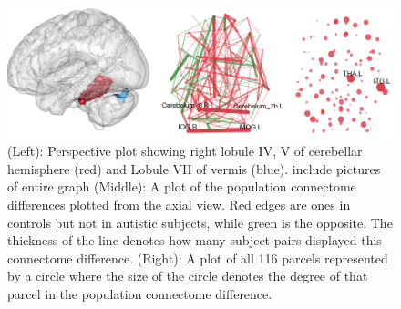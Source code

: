 \documentclass{nature}
\begin{document}
\begin{figure}[tb]
\centering
\includegraphics[width=400pt]{fig/brainconductor/aal_view_expand.png}
\caption{(Left): Perspective plot showing right lobule IV, V of cerebellar
hemisphere
(red) and Lobule VII of vermis (blue). {\color{red}include pictures of entire
graph}
(Middle): A plot of the population connectome differences plotted from
the axial view. Red edges are ones in
controls but not in autistic subjects, while green is the opposite. The
thickness of 
the line denotes how many subject-pairs displayed this connectome difference.
(Right): A plot of all 116 parcels represented by a circle where the size
of the circle denotes the degree of that parcel in the population connectome
difference.
}
\label{fig:aalconnectome}
\end{figure}
\end{document}

